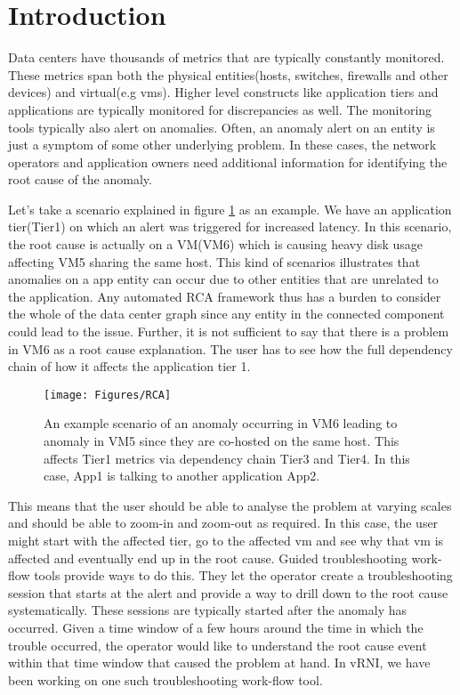 \documentclass[times, twoside, watermark]{zHenriquesLab-StyleBioRxiv}
\begin{document}
\section*{Introduction}
Data centers have thousands of metrics that are typically constantly monitored. These metrics span both the physical entities(hosts, switches, firewalls and other devices) and virtual(e.g vms). Higher level constructs like application tiers and applications are typically monitored for discrepancies as well. The monitoring tools typically also alert on anomalies. Often, an anomaly alert on an entity is just a symptom of some other underlying problem. In these cases, the network operators and application owners need additional information for identifying the root cause of the anomaly.

Let's take a scenario explained in figure \ref{fig:anomaly} as an example. We have an application tier(Tier1) on which an alert was triggered for increased latency. In this scenario, the root cause is actually on a VM(VM6) which is causing heavy disk usage affecting VM5 sharing the same host. This kind of scenarios illustrates that anomalies on a app entity can occur due to other entities that are unrelated to the application. Any automated RCA framework thus has a burden to consider the whole of the data center graph since any entity in the connected component could lead to the issue. Further, it is not sufficient to say that there is a problem in VM6 as a root cause explanation. The user has to see how the full dependency chain of how it affects the application tier 1.

\begin{figure}%
\centering
\texttt{[image: Figures/RCA]}
\caption{An example scenario of an anomaly occurring in VM6 leading to anomaly in VM5 since they are co-hosted on the same host. This affects Tier1 metrics via dependency chain Tier3 and Tier4. In this case, App1 is talking to another application App2.}
\label{fig:anomaly}
\end{figure}


This means that the user should be able to analyse the problem at varying scales and should be able to zoom-in and zoom-out as required. In this case, the user might start with the affected tier, go to the affected vm and see why that vm is affected and eventually end up in the root cause. Guided troubleshooting work-flow tools provide ways to do this. They let the operator create a troubleshooting session that starts at the alert and provide a way to drill down to the root cause systematically. These sessions are typically started after the anomaly has occurred. Given a time window of a few hours around the time in which the trouble occurred, the operator would like to understand the root cause event within that time window that caused the problem at hand. In vRNI, we have been working on one such troubleshooting work-flow tool.
\end{document}
